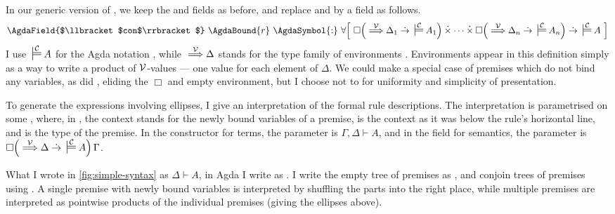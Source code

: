 In our generic version of , we keep the
 and 
fields as before, and replace  and
 by a
 field as follows.
\[
  \AgdaField{$\llbracket$con$\rrbracket$}~\AgdaBound{r}~\AgdaSymbol{:}~%
  \forallb{%
    \Box\plr{{} \env\V \Delta_1 \dotto {} \sdtstile{}\C A_1} \dottimes
    \cdots \dottimes
    \Box\plr{{} \env\V \Delta_n \dotto {} \sdtstile{}\C A_n} \dotto
    {} \sdtstile{}\C A}
\]
I use ${} \sdtstile{}\C A$ for the Agda notation
\AgdaFunction{\_$\C\vDash$}\AgdaSpace{}, while ${} \stackrel{\mathcal V}\Longrightarrow \Delta$
stands for the type family of environments
\AgdaSymbol{$\lambda$}\AgdaSpace{}\AgdaBound{$\Gamma$}\AgdaSpace{}%
\AgdaSymbol{$\to$}\AgdaSpace{}\AgdaSpace{}\AgdaBound{$\V$}%
\AgdaSpace{}\AgdaBound{$\Gamma$}\AgdaSpace{}\AgdaBound{$\Delta$}.
Environments appear in this definition simply as a way to write a product of
$\V$-values --- one value for each element of $\Delta$.
We could make a special case of premises which do not bind any variables, as did
\citet{AACMM21}, eliding the $\Box$ and empty environment, but I choose not to
for uniformity and simplicity of presentation.

To generate the expressions involving ellipses, I give an interpretation of the
formal rule descriptions.
The interpretation is parametrised on some
, where, in
\AgdaBound{,}\AgdaSpace{}\AgdaBound{$\Delta$}\AgdaSpace{}%
\AgdaBound{$\llbracket$}\AgdaSpace{}\AgdaBound{$\Gamma$}\AgdaSpace{}%
\AgdaBound{$\vdash$}\AgdaSpace{}\AgdaSpace{}%
\AgdaBound{$\rrbracket$}, the context \AgdaBound{$\Delta$} stands for the newly
bound variables of a premise, \AgdaBound{$\Gamma$} is the context as it was
below the rule's horizontal line, and  is the type of the premise.
In the  constructor for terms, the parameter is
$\Gamma, \Delta \vdash A$, and in the 
field for semantics, the parameter is
$\Box\plr{{} \env\V \Delta \dotto {} \sdtstile{}\C A}\,\Gamma$.

What I wrote in \cref{fig:simple-syntax} as $\Delta \vdash A$, in Agda I write
as .
I write the empty tree of premises as , and
conjoin trees of premises using .
A single premise with newly bound variables is interpreted by shuffling the
parts into the right place, while multiple premises are interpreted as pointwise
products of the individual premises (giving the ellipses above).

